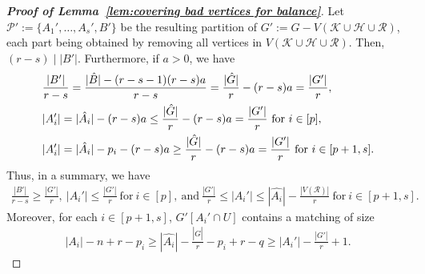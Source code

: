 \documentclass[11pt, a4paper]{article}
\theoremstyle{definition}
\newcommand{\<}{\subseteq}
\begin{document}
\begin{proof}[{\bf Proof of Lemma~\ref{lem:covering bad vertices for balance}}]
{Let $\mathcal{P}':=\{A_1',\ldots,A_s',B'\}$ be the resulting partition of $G':=G-V(\mathcal{K}\cup \mathcal{H}\cup \mathcal{R})$, each part being obtained by removing all vertices in $V(\mathcal{K}\cup \mathcal{H}\cup \mathcal{R})$. Then, $(r-s)\mid |B'|$. 
Furthermore, if $a>0$, we have 
\begin{align}\notag
&\frac{|B'|}{r-s}=\frac{|\hat{B}|-(r-s-1)(r-s)a}{r-s}=\frac{|\hat{G}|}{r}-(r-s)a=\frac{|G'|}{r},
\\\notag
&|A_i'|=|\hat{A_i}|-(r-s)a\leq \frac{|\hat{G}|}{r}-(r-s)a=\frac{|G'|}{r}\ \text{for}\ i\in [p],\\\notag
&|A_i'|=|\hat{A_i}|-p_i-(r-s)a\ge \frac{|\hat{G}|}{r}-(r-s)a=\frac{|G'|}{r}\ \text{for}\ i\in [p+1,s].
\end{align}
Thus, in a summary, we have
\begin{align}\label{G'}
\frac{|B'|}{r-s}\ge \frac{|G'|}{r},\ |A_i'|\leq \frac{|G'|}{r}\ \text{for}\ i\in [p],\ \text{and}\ 
\frac{|G'|}{r}\leq |A_i'|\leq |\hat{A_i}|-\frac{|V(\mathcal{R})|}{r}\ \text{for}\ i\in [p+1,s]. 
\end{align}
Moreover, for each $i\in [p+1,s]$, $G'[A_i'\cap U]$ contains a matching of size} \begin{align}\label{matching'}
    |A_i|-n+r-p_i\geq |\hat{A_i}|-\frac{|\hat{G}|}{r}-p_i+r-q\geq  |A_i'|-\frac{|G'|}{r}+1.
\end{align}

\end{proof}
\end{document}
